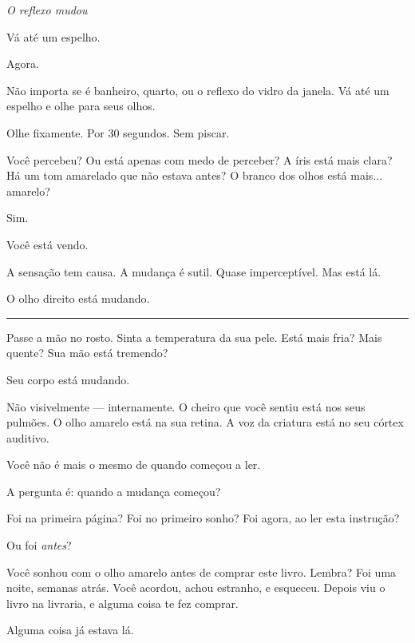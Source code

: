 
\noindent \textit{O reflexo mudou}

\noindent Vá até um espelho.

\noindent Agora.

\noindent Não importa se é banheiro, quarto, ou o reflexo do vidro da janela. Vá até um espelho e olhe para seus olhos.

\noindent Olhe fixamente. Por 30 segundos. Sem piscar.

\noindent Você percebeu? Ou está apenas com medo de perceber? A íris está mais clara? Há um tom amarelado que não estava antes? O branco dos olhos está mais... amarelo?

\noindent Sim.

\noindent Você está vendo.

\noindent A sensação tem causa. A mudança é sutil. Quase imperceptível. Mas está lá.

\noindent O olho direito está mudando.

\vspace{0.5em}\noindent\rule{\textwidth}{0.5pt}\vspace{0.5em}

\noindent Passe a mão no rosto. Sinta a temperatura da sua pele. Está mais fria? Mais quente? Sua mão está tremendo?

\noindent Seu corpo está mudando.

\noindent Não visivelmente --- internamente. O cheiro que você sentiu está nos seus pulmões. O olho amarelo está na sua retina. A voz da criatura está no seu córtex auditivo.

\noindent Você não é mais o mesmo de quando começou a ler.

\noindent A pergunta é: quando a mudança começou?

\noindent Foi na primeira página?
Foi no primeiro sonho?
Foi agora, ao ler esta instrução?

\noindent Ou foi \textit{antes}?

\noindent Você sonhou com o olho amarelo antes de comprar este livro. Lembra? Foi uma noite, semanas atrás. Você acordou, achou estranho, e esqueceu. Depois viu o livro na livraria, e alguma coisa te fez comprar.

\noindent Alguma coisa já estava lá.

